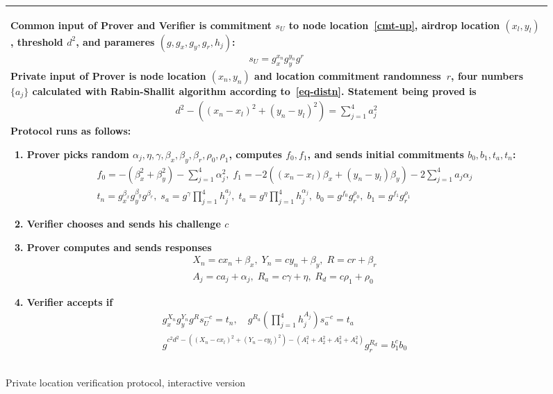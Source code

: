 \documentclass{article}
\begin{document}
{\begin{figure}[!htb]
\begin{tabular}{|p{\linewidth}|}
Common input of Prover and Verifier is
  commitment $s_U$ to node location~\eqref{cmt-up},
  airdrop location $(x_l, y_l)$,
  threshold $d^2$,
  and parameres $(g, g_x, g_y, g_r, h_j)$:
\begin{gather}
\label{cmt-up}
  s_U = g_x^{x_n} g_y^{y_n} g^{r}
\end{gather}
Private input of Prover is
  node location $(x_n, y_n)$ and location commitment randomness~$r$,
  four numbers~$\{a_j\}$ calculated with Rabin-Shallit algorithm according to~\eqref{eq-distn}.
Statement being proved is
\begin{gather}
\label{eq-distn}
  d^2 - ((x_n - x_l)^2 + (y_n - y_l)^2) = \sum_{j=1}^4 a_j^2
\end{gather}
Protocol runs as follows:
\begin{enumerate}
\item
  Prover picks random $\alpha_j, \eta, \gamma, \beta_x, \beta_y, \beta_r, \rho_0, \rho_1$,
  computes $f_0, f_1$, and sends initial commitments $b_0, b_1, t_a, t_n$:
\begin{gather}
  f_0 = -(\beta_x^2 + \beta_y^2) - \sum_{j=1}^4 \alpha_j^2,   \;
  f_1 = -2( (x_n - x_l) \beta_x  + (y_n - y_l) \beta_y) -2 \sum_{j=1}^4 a_j \alpha_j   \\
%
  t_n = g_x^{\beta_x} g_y^{\beta_y} g^{\beta_r} ,   \;
  s_a = g^{\gamma} \prod_{j=1}^4 h_j^{a_j},   \;
  t_a = g^{\eta} \prod_{j=1}^4 h_j^{\alpha_j}, \;
  b_0 = g^{f_0} g_r^{\rho_0},  \;
  b_1 = g^{f_1} g_r^{\rho_1}
\end{gather}
%
\item
  Verifier chooses and sends his challenge $c$
\item
  Prover computes and sends responses
\begin{gather}
  X_n = c x_n + \beta_x,  \;
  Y_n = c y_n + \beta_y,  \;
  R = c r + \beta_r   \\
  A_j = c a_j + \alpha_j, \;
  R_a = c \gamma + \eta,   \;
  R_d = c \rho_1 + \rho_0
\end{gather}
%
\item
  Verifier accepts if
\begin{gather}
\label{verf-linear}
  g_x^{X_n} g_y^{Y_n} g^{R} s_U^{-c} = t_n, \quad
  g^{R_a} (\prod_{j=1}^4 h_j^{A_j}) s_a^{-c} = t_a \\
\label{verf-distn}
  g^{c^2 d^2 - ((X_n - c x_l)^2 + (Y_n - c y_l)^2) - (A_1^2 + A_2^2 + A_3^2 + A_4^2)} g_r^{R_d} = b_1^{c} b_0
\end{gather}
\end{enumerate}
\\
\hline
\end{tabular}
\caption{Private location verification protocol, interactive version}
\label{fig}
\end{figure}

}
\end{document}
